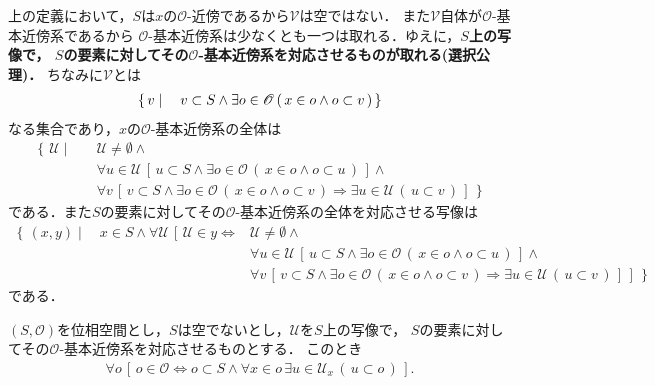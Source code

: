 	上の定義において，$S$は$x$の$\mathscr{O}$-近傍であるから$\mathcal{V}$は空ではない．
	また$\mathcal{V}$自体が$\mathscr{O}$-基本近傍系であるから
	$\mathscr{O}$-基本近傍系は少なくとも一つは取れる．ゆえに，{\bf $S$上の写像で，
	$S$の要素に対してその$\mathscr{O}$-基本近傍系を対応させるものが取れる(選択公理)．}
	ちなみに$\mathcal{V}$とは
	\begin{align}
		\left\{\, v \mid \quad v \subset S \wedge \exists o \in \mathscr{O}\, (\, x \in o \wedge o \subset v\, )\, \right\}
	\end{align}
	なる集合であり，$x$の$\mathscr{O}$-基本近傍系の全体は
	\begin{align}
		\left\{\, \mathcal{U} \mid \quad \right.
		&\mathcal{U} \neq \emptyset \wedge \\
		&\forall u \in \mathcal{U}\, [\, u \subset S \wedge \exists o \in \mathscr{O}\, (\, x \in o \wedge o \subset u\, )\, ] \wedge \\
		&\forall v\, \left.\left[\, v \subset S \wedge \exists o \in \mathscr{O}\, (\, x \in o \wedge o \subset v\, )
		\Longrightarrow \exists u \in \mathcal{U}\, (\, u \subset v\, )\, \right]\, \right\}
	\end{align}
	である．また$S$の要素に対してその$\mathscr{O}$-基本近傍系の全体を対応させる写像は
	\begin{align}
		\left\{\, (x,y) \mid \quad x \in S \wedge
		\forall \mathcal{U}\, \left[\, \mathcal{U} \in y \Longleftrightarrow \right.\right. 
		&\mathcal{U} \neq \emptyset \wedge \\
		&\forall u \in \mathcal{U}\, \left[\, u \subset S \wedge \exists o \in \mathscr{O}\, (\, x \in o \wedge o \subset u\, )\, \right] \wedge \\
		&\forall v\, \left.\left.\left[\, v \subset S \wedge \exists o \in \mathscr{O}\, (\, x \in o \wedge o \subset v\, )
		\Longrightarrow \exists u \in \mathcal{U}\, (\, u \subset v\, )\, \right]\, \right]\, \right\}
	\end{align}
	である．
	
	\begin{screen}
		\begin{thm}[基本近傍系は位相を復元する]
		\label{thm:local_base_defines_open_sets}
			$(S,\mathscr{O})$を位相空間とし，$S$は空でないとし，$\mathcal{U}$を$S$上の写像で，
			$S$の要素に対してその$\mathscr{O}$-基本近傍系を対応させるものとする．
			このとき
			\begin{align}
				\forall o\, \left[\, o \in \mathscr{O} \Longleftrightarrow
				o \subset S \wedge \forall x \in o\, \exists u \in \mathcal{U}_{x}\, (\, u \subset o\, )\, \right].
			\end{align}
		\end{thm}
	\end{screen}
	
